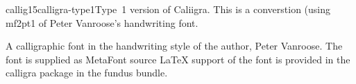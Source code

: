 \documentclass{ddltxtyp}
\begin{document}


\begin{package}{callig15}{calligra-type1}{Type~1 version of Caliigra.}
This is a converstion (using mf2pt1 of Peter Vanroose's
handwriting font.

A calligraphic font in the handwriting style of the author,
Peter Vanroose. The font is supplied as MetaFont source {\LaTeX}
support of the font is provided in the calligra package in the
fundus bundle.
\end{package}

\end{document}
